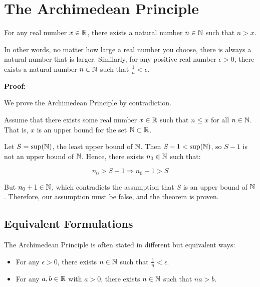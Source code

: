 \newpage
\section{The Archimedean Principle}

For any real number \( x \in \mathbb{R} \), there exists a natural number \( n \in \mathbb{N} \) such 
that \( n > x \).
\vspace{\baselineskip}

In other words, no matter how large a real number you choose, there is always a natural number that 
is larger. Similarly, for any positive real number \( \epsilon > 0 \), there exists a natural number 
\( n \in \mathbb{N} \) such that \( \frac{1}{n} < \epsilon \).
\vspace{\baselineskip}

\textbf{Proof:}

We prove the Archimedean Principle by contradiction.
\vspace{\baselineskip}

Assume that there exists some real number \( x \in \mathbb{R} \) such that \( n \leq x \) for all 
\( n \in \mathbb{N} \). That is, \( x \) is an upper bound for the set \( \mathbb{N} \subset \mathbb{R}\).
\vspace{\baselineskip}

Let \( S = \sup(\mathbb{N}) \), the least upper bound of \( \mathbb{N} \). Then 
\( S - 1 < \sup(\mathbb{N}) \), so \( S - 1 \) is not an upper bound of \( \mathbb{N} \). Hence, 
there exists \( n_0 \in \mathbb{N} \) such that:

\[
	n_0 > S - 1 \Rightarrow n_0 + 1 > S
\]

But \( n_0 + 1 \in \mathbb{N} \), which contradicts the assumption that \( S \) is an upper bound of \( \mathbb{N} \). Therefore, our assumption must be false, and the theorem is proven.

\QED

\subsection{Equivalent Formulations}

The Archimedean Principle is often stated in different but equivalent ways:

\begin{itemize}
	\item For any \( \epsilon > 0 \), there exists \( n \in \mathbb{N} \) such that \( \frac{1}{n} < \epsilon \).
	\item For any \( a, b \in \mathbb{R} \) with \( a > 0 \), there exists \( n \in \mathbb{N} \) such that \( na > b \).
\end{itemize}

